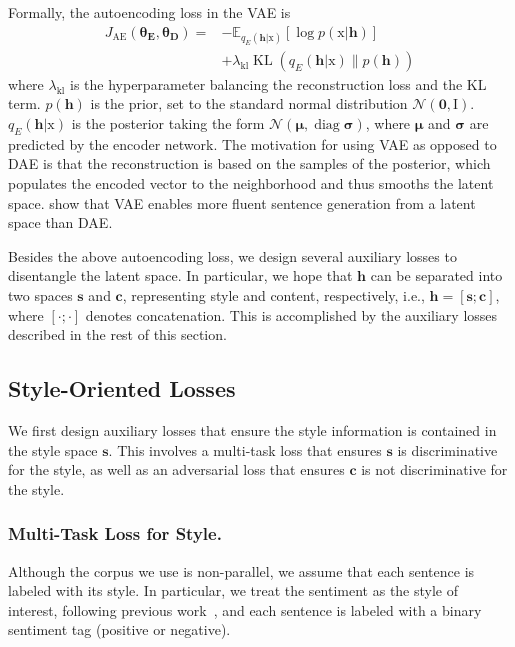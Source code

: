 \documentclass[letterpaper]{article} %
\newcommand{\rmx}{\mathrm x}
\newcommand{\loss}[1]{J_{\text{#1}}}
\newcommand{\hyp}[1]{\lambda_{\text{#1}}}
\newcommand{\nnweight}[1]{\bm{\theta_{\text{#1}}}}
\newcommand{\citeay}[1]{\citeauthor{#1} \shortcite{#1}}
\begin{document}
Formally, the autoencoding loss in the VAE is
\begin{align}
	\loss{AE}(\nnweight{E}, \nnweight{D}) = & - \mathbb{E}_{q_{E}(\bm h|\rmx)} [\log p(\rmx|\bm h)]  \nonumber \\
	                                        & + \hyp{kl}\operatorname{KL}(q_{E}(\bm h|\rmx)\|p(\bm h))
\end{align}
where $\hyp{kl}$ is the hyperparameter balancing the reconstruction loss and the KL term. $p(\bm h)$ is the prior, set to the standard normal distribution $\mathcal{N}(\bm 0,\mathrm I)$. $q_E(\bm h|\mathrm x)$ is the posterior taking the form $\mathcal{N}(\bm \mu,\operatorname{diag} \bm\sigma)$, where $\bm\mu$ and $\bm\sigma$ are predicted by the encoder network.
The motivation for using VAE as opposed to DAE is that the reconstruction is based on the samples of the posterior, which populates the encoded vector to the neighborhood and thus smooths the latent space.
\citeay{bowman2016generating} show that VAE enables more fluent sentence generation from a latent space than DAE.

Besides the above autoencoding loss, we design several auxiliary losses to disentangle the latent space. In particular, we hope that $\bm h$ can be separated into two spaces $\bm s$ and $\bm c$, representing style and content, respectively, i.e., $\bm h = [\bm s ; \bm c]$, where $[\cdot;\cdot]$ denotes concatenation.
This is accomplished by the auxiliary losses described in the rest of this section.


\subsection{Style-Oriented Losses}

We first design auxiliary losses that ensure the style information is contained in the style space $\bm s$.
This involves a multi-task loss that ensures $\bm s$ is discriminative for the style, as well as an adversarial loss that ensures $\bm c$ is not discriminative for the style.

\subsubsection{Multi-Task Loss for Style.} \label{ssec:multitask-style-objective}
Although the corpus we use is non-parallel, we assume that each sentence is labeled with its style. In particular, we treat the sentiment as the style of interest, following previous work~\cite{hu2017toward,shen2017style,fu2018style,zhao2018adversarially}, and each sentence is labeled with a binary sentiment tag (positive or negative).
\end{document}
